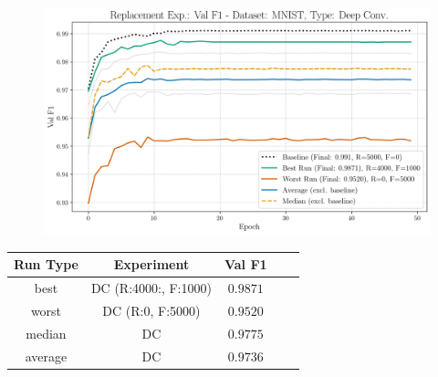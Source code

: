 \begin{figure}[htbp]
	\centering
	\includegraphics[width=.85\textwidth]{abb/strat_classifier_performance/MNIST_STRATIFIED_CLASSIFIERS_VANILLA_GAN/replacement_experiments/val_f1_score_['VANILLA']_MNIST_all.png}
	\label{fig:app_strat_class_performance_replacement_exp._val_f1_score_DCGAN}
\end{figure}
\begin{table}[H]
	\centering
	\vspace{-1em}
	\begin{tabular}{|c|c|c|c|c|}
		\hline
		Run Type & Experiment & Val F1 \\ \hline
		best & DC (R:4000:, F:1000) & $0.9871$\\ \hline
		worst & DC (R:0, F:5000) & $0.9520$\\ \hline
		median & DC & $0.9775$\\ \hline
		average & DC & $0.9736$
		\\ \hline
	\end{tabular}
\end{table}
\newpage
